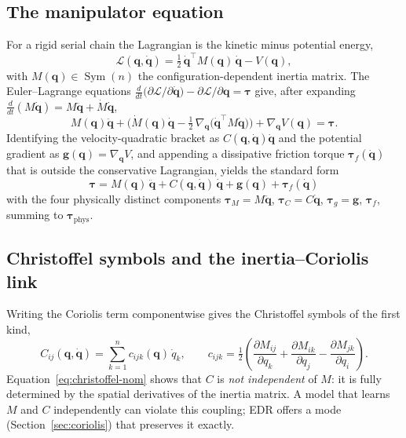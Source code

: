 \documentclass[11pt]{article}
\newcommand{\q}{\bm{q}}
\newcommand{\qd}{\dot{\bm{q}}}
\newcommand{\qdd}{\ddot{\bm{q}}}
\newcommand{\tphys}{\bm{\tau}_{\mathrm{phys}}}
\newcommand{\tg}{\bm{\tau}_g}
\newcommand{\tM}{\bm{\tau}_M}
\newcommand{\tC}{\bm{\tau}_C}
\newcommand{\tf}{\bm{\tau}_f}
\newcommand{\Mmat}{M}
\newcommand{\Cmat}{C}
\newcommand{\half}{\tfrac{1}{2}}
\newcommand{\transp}{^{\top}}
\DeclareMathOperator{\Symop}{Sym}
\theoremstyle{definition}
\theoremstyle{plain}
\begin{document}
\subsection{The manipulator equation}
For a rigid serial chain the Lagrangian is the kinetic minus potential energy,
\begin{equation}
\mathcal{L}(\q,\qd)=\half\,\qd\transp \Mmat(\q)\,\qd - V(\q),
\end{equation}
with $\Mmat(\q)\in\Symop(n)$ the configuration-dependent inertia matrix. The
Euler--Lagrange equations
$\frac{d}{dt}\!\big(\partial\mathcal L/\partial\qd\big)-\partial\mathcal L/\partial\q=\bm{\tau}$
give, after expanding $\frac{d}{dt}(\Mmat\qd)=\Mmat\qdd+\dot{\Mmat}\qd$,
\begin{equation}
\Mmat(\q)\qdd+\Big(\dot{\Mmat}(\q)\qd-\half\,\nabla_{\q}\!\big(\qd\transp\Mmat\qd\big)\Big)+\nabla_{\q}V(\q)=\bm{\tau}.
\label{eq:el}
\end{equation}
Identifying the velocity-quadratic bracket as $\Cmat(\q,\qd)\qd$ and the
potential gradient as $\bm g(\q)=\nabla_{\q} V$, and appending a dissipative
friction torque $\tf(\qd)$ that is outside the conservative Lagrangian, yields the
standard form
\begin{equation}
\boxed{\;\bm{\tau}=\Mmat(\q)\,\qdd+\Cmat(\q,\qd)\,\qd+\bm g(\q)+\tf(\qd)\;}
\label{eq:rbd}
\end{equation}
with the four physically distinct components
$\tM=\Mmat\qdd$, $\tC=\Cmat\qd$, $\tg=\bm g$, $\tf$, summing to $\tphys$.

\subsection{Christoffel symbols and the inertia--Coriolis link}
Writing the Coriolis term componentwise gives the Christoffel symbols of the
first kind,
\begin{equation}
\Cmat_{ij}(\q,\qd)=\sum_{k=1}^{n}c_{ijk}(\q)\,\dot q_k,
\qquad
c_{ijk}=\half\!\left(\frac{\partial \Mmat_{ij}}{\partial q_k}
+\frac{\partial \Mmat_{ik}}{\partial q_j}
-\frac{\partial \Mmat_{jk}}{\partial q_i}\right).
\label{eq:christoffel-nom}
\end{equation}
Equation~\eqref{eq:christoffel-nom} shows that $\Cmat$ is \emph{not independent}
of $\Mmat$: it is fully determined by the spatial derivatives of the inertia
matrix. A model that learns $\Mmat$ and $\Cmat$ independently can violate this
coupling; EDR offers a mode (Section~\ref{sec:coriolis}) that preserves it
exactly.
\end{document}
